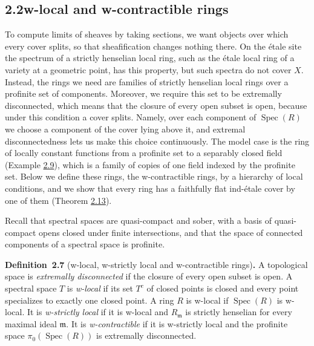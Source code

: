 \documentclass[11pt]{article}
\newenvironment{bpstatement}[2]{\par\addvspace{0.6\baselineskip}\noindent\textbf{#1}#2\textbf{.}\enspace\ignorespaces}
  {\par\addvspace{0.4\baselineskip}}
\begin{document}
\subsection*{\texorpdfstring{2.2\quad w-local and w-contractible rings}{2.2 w-local and w-contractible rings}}
\label{bp19}%
\label{bp20}%
To compute limits of sheaves by taking sections, we want objects over which every cover splits, so that sheafification changes nothing there. On the étale site the spectrum of a strictly henselian local ring, such as the étale local ring of a variety at a geometric point, has this property, but such spectra do not cover \(X\). Instead, the rings we need are families of strictly henselian local rings over a profinite set of components. Moreover, we require this set to be extremally disconnected, which means that the closure of every open subset is open, because under this condition a cover splits. Namely, over each component of \(\operatorname{Spec}(R)\) we choose a component of the cover lying above it, and extremal disconnectedness lets us make this choice continuously. The model case is the ring of locally constant functions from a profinite set to a separably closed field (Example \hyperref[bp26]{2.9}), which is a family of copies of one field indexed by the profinite set. Below we define these rings, the w-contractible rings, by a hierarchy of local conditions, and we show that every ring has a faithfully flat ind-étale cover by one of them (Theorem \hyperref[bp37]{2.13}).

Recall that spectral spaces are quasi-compact and sober, with a basis of quasi-compact opens closed under finite intersections, and that the space of connected components of a spectral space is profinite.

\label{bp21}%
\begin{bpstatement}{Definition~2.7}{ (w-local, w-strictly local and w-contractible rings)}
A topological space is \emph{extremally disconnected} if the closure of every open subset is open. A spectral space \(T\) is \emph{w-local} if its set \(T^c\) of closed points is closed and every point specializes to exactly one closed point. A ring \(R\) is w-local if \(\operatorname{Spec}(R)\) is w-local. It is \emph{w-strictly local} if it is w-local and \(R_{\mathfrak m}\) is strictly henselian for every maximal ideal \(\mathfrak m\). It is \emph{w-contractible} if it is w-strictly local and the profinite space \(\pi_0(\operatorname{Spec}(R))\) is extremally disconnected.
\end{bpstatement}
\end{document}
